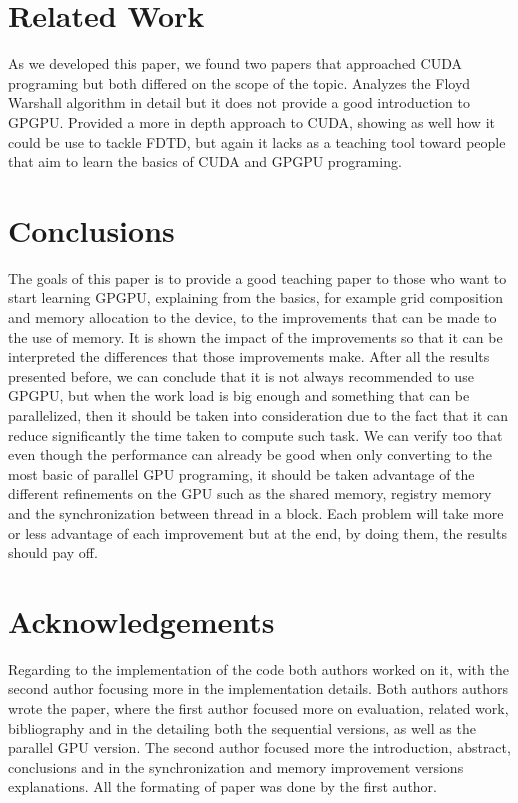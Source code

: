 \documentclass[conference]{IEEEtran}
\begin{document}
\section{Related Work}

As we developed this paper, we found two papers that approached CUDA programing but both differed on the scope of the topic. \cite{floyd warshall}Analyzes the Floyd Warshall algorithm in detail but it does not provide a good introduction to GPGPU. \cite{study on FDTD}Provided a more in depth approach to CUDA, showing as well how it could be use to tackle FDTD, but again it lacks as a teaching tool toward people that aim to learn the basics of CUDA and GPGPU programing.

\section{Conclusions}

The goals of this paper is to provide a good teaching paper to those who want to start learning GPGPU, explaining from the basics, for example grid composition and memory allocation to the device, to the improvements that can be made to the use of memory. It is shown the impact of the improvements so that it can be interpreted the differences that those improvements make.
After all the results presented before, we can conclude that it is not always recommended to use GPGPU, but when the work load is big enough and something that can be parallelized, then it should be taken into consideration due to the fact that it can reduce significantly the time taken to compute such task. We can verify too that even though the performance can already be good when only converting to the most basic of parallel GPU programing, it should be taken advantage of the different refinements on the GPU such as the shared memory, registry memory and the synchronization between thread in a block. Each problem will take more or less advantage of each improvement but at the end, by doing them, the results should pay off.

\section*{Acknowledgements}

Regarding to the implementation of the code both authors worked on it, with the second author focusing more in the implementation details. Both authors authors wrote the paper, where the first author focused more on evaluation, related work, bibliography and in the detailing both the sequential versions, as well as the parallel GPU version. The second author focused more the introduction, abstract, conclusions and in the synchronization and memory improvement versions explanations.
All the formating of paper was done by the first author.
\end{document}
